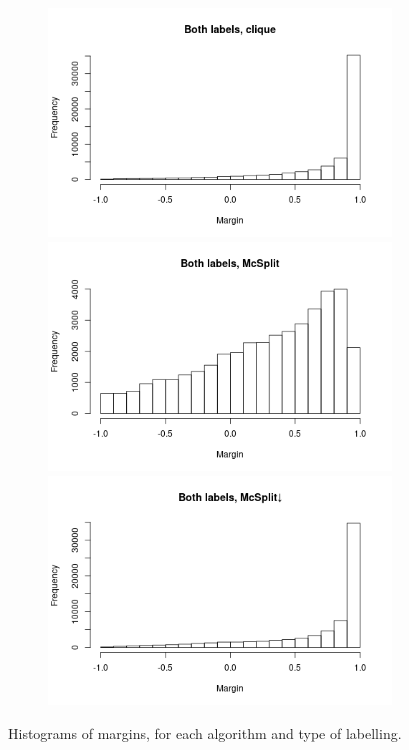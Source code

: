 \documentclass{l4proj}
\theoremstyle{definition}
\theoremstyle{remark}
\begin{document}
\begin{figure}
\begin{subfigure}[t]{0.49\textwidth}
  \end{subfigure}
  \begin{subfigure}[t]{0.49\textwidth}
    \centering
    \includegraphics[width=\textwidth]{images/both_labels_clique_hist.png}
    \includegraphics[width=\textwidth]{images/both_labels_mcsplit_hist.png}
    \includegraphics[width=\textwidth]{images/both_labels_mcsplitdown_hist.png}
  \end{subfigure}
  \caption{Histograms of margins, for each algorithm and type of labelling.}
  \label{fig:margin_hist}
\end{figure}
\end{document}

